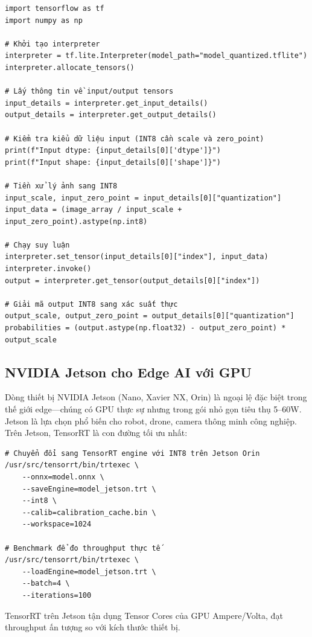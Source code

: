 \begin{verbatim}
import tensorflow as tf
import numpy as np

# Khởi tạo interpreter
interpreter = tf.lite.Interpreter(model_path="model_quantized.tflite")
interpreter.allocate_tensors()

# Lấy thông tin về input/output tensors
input_details = interpreter.get_input_details()
output_details = interpreter.get_output_details()

# Kiểm tra kiểu dữ liệu input (INT8 cần scale và zero_point)
print(f"Input dtype: {input_details[0]['dtype']}")
print(f"Input shape: {input_details[0]['shape']}")

# Tiền xử lý ảnh sang INT8
input_scale, input_zero_point = input_details[0]["quantization"]
input_data = (image_array / input_scale + input_zero_point).astype(np.int8)

# Chạy suy luận
interpreter.set_tensor(input_details[0]["index"], input_data)
interpreter.invoke()
output = interpreter.get_tensor(output_details[0]["index"])

# Giải mã output INT8 sang xác suất thực
output_scale, output_zero_point = output_details[0]["quantization"]
probabilities = (output.astype(np.float32) - output_zero_point) * output_scale
\end{verbatim}

\subsection*{NVIDIA Jetson cho Edge AI với GPU}

Dòng thiết bị NVIDIA Jetson (Nano, Xavier NX, Orin) là ngoại lệ đặc biệt trong thế giới edge---chúng có GPU thực sự nhưng trong gói nhỏ gọn tiêu thụ 5--60W. Jetson là lựa chọn phổ biến cho robot, drone, camera thông minh công nghiệp. Trên Jetson, TensorRT là con đường tối ưu nhất:

\begin{verbatim}
# Chuyển đổi sang TensorRT engine với INT8 trên Jetson Orin
/usr/src/tensorrt/bin/trtexec \
    --onnx=model.onnx \
    --saveEngine=model_jetson.trt \
    --int8 \
    --calib=calibration_cache.bin \
    --workspace=1024

# Benchmark để đo throughput thực tế
/usr/src/tensorrt/bin/trtexec \
    --loadEngine=model_jetson.trt \
    --batch=4 \
    --iterations=100
\end{verbatim}

TensorRT trên Jetson tận dụng Tensor Cores của GPU Ampere/Volta, đạt throughput ấn tượng so với kích thước thiết bị.

